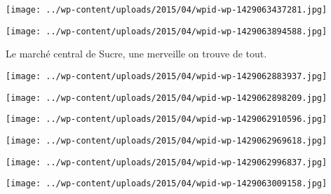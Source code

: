  

\begin{center} \texttt{[image: ../wp-content/uploads/2015/04/wpid-wp-1429063437281.jpg]} \end{center}



 

\begin{center} \texttt{[image: ../wp-content/uploads/2015/04/wpid-wp-1429063894588.jpg]} \end{center}



 Le marché central de Sucre, une merveille on trouve de tout. 

 

\begin{center} \texttt{[image: ../wp-content/uploads/2015/04/wpid-wp-1429062883937.jpg]} \end{center}



 

\begin{center} \texttt{[image: ../wp-content/uploads/2015/04/wpid-wp-1429062898209.jpg]} \end{center}



 

\begin{center} \texttt{[image: ../wp-content/uploads/2015/04/wpid-wp-1429062910596.jpg]} \end{center}



 

\begin{center} \texttt{[image: ../wp-content/uploads/2015/04/wpid-wp-1429062969618.jpg]} \end{center}



 

\begin{center} \texttt{[image: ../wp-content/uploads/2015/04/wpid-wp-1429062996837.jpg]} \end{center}



 

\begin{center} \texttt{[image: ../wp-content/uploads/2015/04/wpid-wp-1429063009158.jpg]} \end{center}



